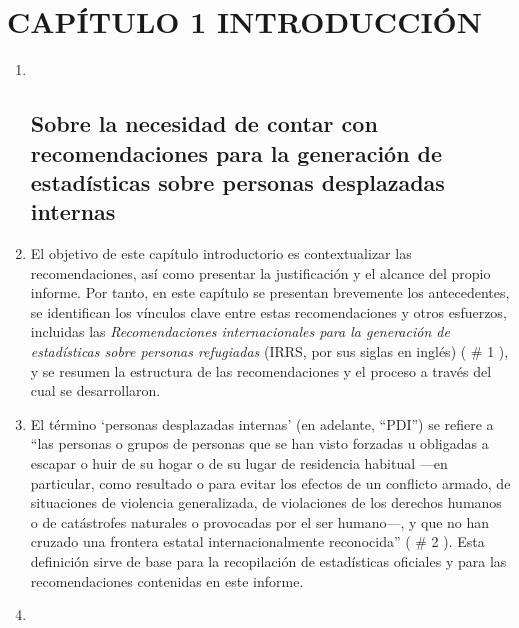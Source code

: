 \documentclass[
]{book}
\begin{document}
\hypertarget{capuxedtulo-1-introducciuxf3n}{%
\chapter{CAPÍTULO 1 INTRODUCCIÓN}\label{capuxedtulo-1-introducciuxf3n}}

\begin{enumerate}
\def\labelenumi{\arabic{enumi}.}
\item ~
  \hypertarget{sobre-la-necesidad-de-contar-con-recomendaciones-para-la-generaciuxf3n-de-estaduxedsticas-sobre-personas-desplazadas-internas}{%
  \section{Sobre la necesidad de contar con recomendaciones para la generación de estadísticas sobre personas desplazadas internas}\label{sobre-la-necesidad-de-contar-con-recomendaciones-para-la-generaciuxf3n-de-estaduxedsticas-sobre-personas-desplazadas-internas}}
\item
  El objetivo de este capítulo introductorio es contextualizar las recomendaciones, así como presentar la justificación y el alcance del propio informe. Por tanto, en este capítulo se presentan brevemente los antecedentes, se identifican los vínculos clave entre estas recomendaciones y otros esfuerzos, incluidas las \emph{Recomendaciones internacionales para la generación de estadísticas sobre personas refugiadas} (IRRS, por sus siglas en inglés) (
  \# 1
  ), y se resumen la estructura de las recomendaciones y el proceso a través del cual se desarrollaron.
\item
  El término `personas desplazadas internas' (en adelante, ``PDI'') se refiere a ``las personas o grupos de personas que se han visto forzadas u obligadas a escapar o huir de su hogar o de su lugar de residencia habitual ---en particular, como resultado o para evitar los efectos de un conflicto armado, de situaciones de violencia generalizada, de violaciones de los derechos humanos o de catástrofes naturales o provocadas por el ser humano---, y que no han cruzado una frontera estatal internacionalmente reconocida'' (
  \# 2
  ). Esta definición sirve de base para la recopilación de estadísticas oficiales y para las recomendaciones contenidas en este informe.
\item

\end{enumerate}
\end{document}
